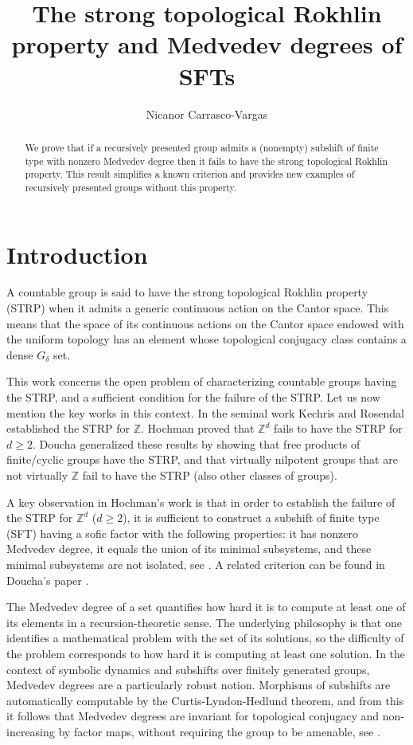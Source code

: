 \documentclass[a4paper,oneside]{amsart}
\title{The strong topological Rokhlin property and Medvedev degrees of SFTs}
\author{Nicanor Carrasco-Vargas}
\renewcommand{\(}{\begin{dmath*}}
\renewcommand{\)}{\end{dmath*}}
\theoremstyle{definition}
\newcommand{\Z}{\mathbb{Z}}
\begin{document}
\maketitle
\begin{abstract}
We prove that if a recursively presented group  admits a (nonempty) subshift of finite type with nonzero Medvedev degree then it fails to have the strong topological Rokhlin property. This result simplifies a known criterion and provides new examples of recursively presented groups without this property. 
\end{abstract}
\section{Introduction}
A countable group is said to have the strong topological Rokhlin property (STRP) when it admits a generic continuous action on the Cantor space. This means that  the space of its continuous actions on the Cantor space endowed with the uniform topology has an element  whose topological conjugacy class contains a dense $G_\delta$ set. 

This work concerns the open problem of characterizing countable groups having the STRP, and a sufficient condition for the failure of the STRP. Let us now mention the key works in this context. In the seminal work    \cite{kechris_turbulence_2007} Kechris and Rosendal established the STRP for $\Z$. Hochman \cite{hochman_rohlin_2012} proved that $\Z^d$ fails to have the STRP for $d\geq 2$. Doucha \cite{doucha_strong_2024} generalized these results by showing that free products of finite/cyclic groups have the STRP, and that virtually nilpotent groups that are not virtually $\Z$ fail to have the STRP (also other classes of groups). 

A key observation in  
Hochman's work is that in order to establish the failure of the STRP for $\mathbb{Z}^d$ ($d\geq 2$), it is sufficient to construct a subshift of finite type (SFT) having a sofic factor with the following properties: it has nonzero Medvedev  degree, it equals the union of its minimal subsystems, and these minimal subsystems are not isolated, see \cite[\S 5.1]{hochman_rohlin_2012}.  A related criterion can be found in Doucha's paper  \cite[\S 5.1]{doucha_strong_2024}.

The Medvedev degree of a set quantifies how hard it is to compute at least one of its elements in a recursion-theoretic sense. The underlying philosophy is that one identifies a mathematical problem with the set of its solutions, so the difficulty of the problem corresponds to how hard it is computing at least one solution. In the context of symbolic dynamics and subshifts over finitely generated groups,  Medvedev degrees are a particularly robust notion. Morphisms of subshifts are automatically computable by the Curtis-Lyndon-Hedlund theorem, and from this it follows that Medvedev degrees are invariant for topological conjugacy and non-increasing by factor maps, without requiring the group to be amenable, see \cite{simpson_medvedev_2014,barbieri_medvedev_2024}.
\end{document}
